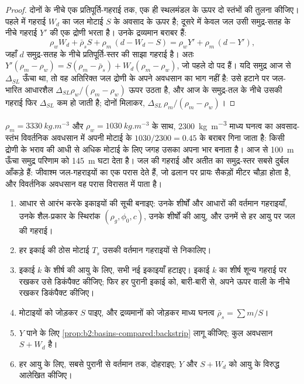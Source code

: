 \begin{proof}
दोनों के नीचे एक प्रतिपूर्ति-गहराई तक, एक ही स्थलमंडल के ऊपर दो स्तंभों की तुलना कीजिए।
पहले में गहराई $W_d$ का जल मोटाई $S$ के अवसाद के ऊपर है; दूसरे में केवल जल
उसी समुद्र-सतह के नीचे गहराई $Y'$ की एक द्रोणी भरता है। उनके द्रव्यमान बराबर हैं:
\[
  \rho_w W_d + \bar\rho_s S + \rho_m\,(d - W_d - S) = \rho_w Y' + \rho_m\,(d - Y'),
\]
जहाँ $d$ समुद्र-सतह के नीचे प्रतिपूर्ति-स्तर की साझा गहराई है। अतः
$Y'(\rho_m - \rho_w) = S(\rho_m - \bar\rho_s) + W_d(\rho_m - \rho_w)$, जो पहले दो
पद हैं। यदि समुद्र आज से $\Delta_{SL}$ ऊँचा था, तो वह अतिरिक्त जल द्रोणी के
अपने अवधसान का भाग नहीं है: उसे हटाने पर जल-भारित आधारशैल
$\Delta_{SL}\rho_w/(\rho_m - \rho_w)$ ऊपर उठता है, और आज के समुद्र-तल के नीचे उसकी गहराई फिर
$\Delta_{SL}$ कम हो जाती है; दोनों मिलाकर, $\Delta_{SL}\,\rho_m/(\rho_m - \rho_w)$।
\end{proof}

$\rho_m = \qty{3330}{kg.m^{-3}}$ और $\rho_w = \qty{1030}{kg.m^{-3}}$ के साथ,
\qty{2300}{kg.m^{-3}} माध्य घनत्व का अवसाद-स्तंभ विवर्तनिक अवधसान में अपनी मोटाई के $1030/2300 = 0.45$ के बराबर
गिना जाता है: किसी द्रोणी के भराव की आधी से अधिक मोटाई के लिए जगह उसका अपना भार बनाता है।
आज से \qty{100}{m} ऊँचा समुद्र परिणाम को \qty{145}{m} घटा देता है। जल की गहराई और
अतीत का समुद्र-स्तर सबसे दुर्बल आँकड़े हैं: जीवाश्म जल-गहराइयों का एक परास देते हैं, जो ढलान पर प्रायः सैकड़ों
मीटर चौड़ा होता है, और विवर्तनिक अवधसान वह परास विरासत में पाता है।

\begin{method}[किसी कुएँ का बैकस्ट्रिपिंग]\label{met:b2:basins-compared:backstrip}
\begin{enumerate}
  \item आधार से आरंभ करके इकाइयों की सूची बनाइए: उनके शीर्षों और आधारों की वर्तमान गहराइयाँ, उनके
        शैल-प्रकार के स्थिरांक $(\rho_g, \phi_0, c)$, उनके शीर्षों की आयु, और उनमें से हर आयु पर
        जल की गहराई।
  \item हर इकाई की ठोस मोटाई $T_s$ उसकी वर्तमान गहराइयों से निकालिए।
  \item इकाई $k$ के शीर्ष की आयु के लिए, सभी नई इकाइयाँ हटाइए। इकाई $k$ का शीर्ष
        शून्य गहराई पर रखकर उसे डिकंपैक्ट कीजिए; फिर हर पुरानी इकाई को, बारी-बारी से, अपने ऊपर वाली के नीचे रखकर
        डिकंपैक्ट कीजिए।
  \item मोटाइयों को जोड़कर $S$ पाइए, और द्रव्यमानों को जोड़कर माध्य घनत्व
        $\bar\rho_s = \sum m / S$।
  \item $Y$ पाने के लिए \cref{prop:b2:basins-compared:backstrip} लागू कीजिए; कुल अवधसान
        $S + W_d$ है।
  \item हर आयु के लिए, सबसे पुरानी से वर्तमान तक, दोहराइए; $Y$ और $S + W_d$ को आयु के विरुद्ध आलेखित कीजिए।
\end{enumerate}
\end{method}

